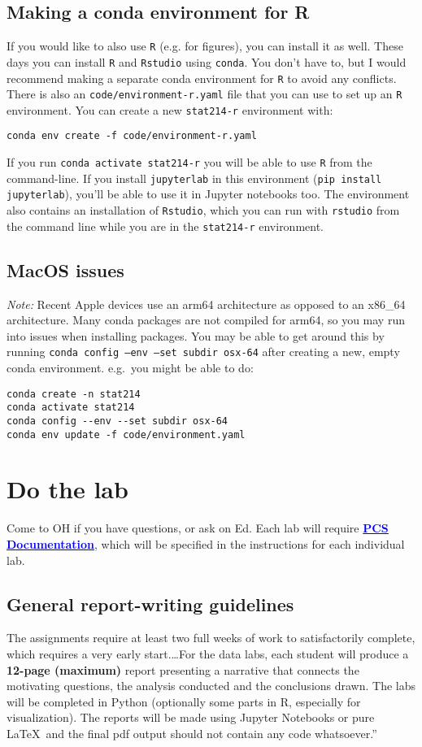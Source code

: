 \documentclass[letterpaper,12pt]{article}
\begin{document}
\subsection{Making a conda environment for R}
If you would like to also use \texttt{R} (e.g. for figures), you can install it as well. These days you can install \texttt{R} and \texttt{Rstudio} using \texttt{conda}. You don't have to, but I would recommend making a separate conda environment for \texttt{R} to avoid any conflicts. There is also an \texttt{code/environment-r.yaml} file that you can use to set up an \texttt{R} environment. You can create a new \texttt{stat214-r} environment with:
\begin{verbatim}
conda env create -f code/environment-r.yaml
\end{verbatim}
If you run \texttt{conda activate stat214-r} you will be able to use \texttt{R} from the command-line. If you install \texttt{jupyterlab} in this environment (\texttt{pip install jupyterlab}), you'll be able to use it in Jupyter notebooks too. The environment also contains an installation of \texttt{Rstudio}, which you can run with \texttt{rstudio} from the command line while you are in the \texttt{stat214-r} environment.

\subsection{MacOS issues}
\textit{Note:} Recent Apple devices use an arm64 architecture as opposed to an x86\_64 architecture. Many conda packages are not compiled for arm64, so you may run into issues when installing packages. You may be able to get around this by running \texttt{conda config --env --set subdir osx-64} after creating a new, empty conda environment. e.g.~you might be able to do:
\begin{verbatim}
conda create -n stat214
conda activate stat214
conda config --env --set subdir osx-64
conda env update -f code/environment.yaml
\end{verbatim}

\section{Do the lab}
Come to OH if you have questions, or ask on Ed. Each lab will require \href{https://yu-group.github.io/vdocs/PCSDoc-Template.html}{\textcolor{blue}{\textbf{PCS Documentation}}}, which will be specified in the instructions for each individual lab.

\subsection{General report-writing guidelines}
The assignments require at least two full weeks of work to satisfactorily complete, which requires a very early start.\ldots For the data labs, each student will produce a \textbf{12-page (maximum)} report presenting a narrative that connects the motivating
questions, the analysis conducted and the conclusions drawn. The labs will be completed in Python
(optionally some parts in R, especially for visualization). The reports will be made using Jupyter
Notebooks or pure \LaTeX\ and the final pdf output should not contain any code whatsoever.''
\end{document}
